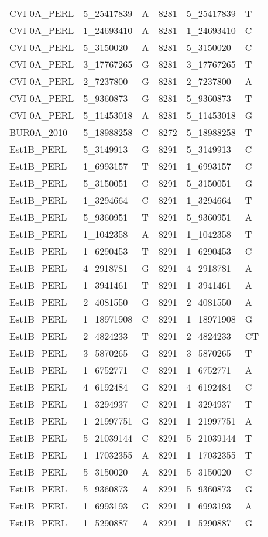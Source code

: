 \begin{center}
\begin{longtable}{|l|l|l|l|l|l|}
CVI-0A\_PERL&5\_25417839&A&8281&5\_25417839&T\\
CVI-0A\_PERL&1\_24693410&A&8281&1\_24693410&C\\
CVI-0A\_PERL&5\_3150020&A&8281&5\_3150020&C\\
CVI-0A\_PERL&3\_17767265&G&8281&3\_17767265&T\\
CVI-0A\_PERL&2\_7237800&G&8281&2\_7237800&A\\
CVI-0A\_PERL&5\_9360873&G&8281&5\_9360873&T\\
CVI-0A\_PERL&5\_11453018&A&8281&5\_11453018&G\\
BUR0A\_2010&5\_18988258&C&8272&5\_18988258&T\\
Est1B\_PERL&5\_3149913&G&8291&5\_3149913&C\\
Est1B\_PERL&1\_6993157&T&8291&1\_6993157&C\\
Est1B\_PERL&5\_3150051&C&8291&5\_3150051&G\\
Est1B\_PERL&1\_3294664&C&8291&1\_3294664&T\\
Est1B\_PERL&5\_9360951&T&8291&5\_9360951&A\\
Est1B\_PERL&1\_1042358&A&8291&1\_1042358&T\\
Est1B\_PERL&1\_6290453&T&8291&1\_6290453&C\\
Est1B\_PERL&4\_2918781&G&8291&4\_2918781&A\\
Est1B\_PERL&1\_3941461&T&8291&1\_3941461&A\\
Est1B\_PERL&2\_4081550&G&8291&2\_4081550&A\\
Est1B\_PERL&1\_18971908&C&8291&1\_18971908&G\\
Est1B\_PERL&2\_4824233&T&8291&2\_4824233&CT\\
Est1B\_PERL&3\_5870265&G&8291&3\_5870265&T\\
Est1B\_PERL&1\_6752771&C&8291&1\_6752771&A\\
Est1B\_PERL&4\_6192484&G&8291&4\_6192484&C\\
Est1B\_PERL&1\_3294937&C&8291&1\_3294937&T\\
Est1B\_PERL&1\_21997751&G&8291&1\_21997751&A\\
Est1B\_PERL&5\_21039144&C&8291&5\_21039144&T\\
Est1B\_PERL&1\_17032355&A&8291&1\_17032355&T\\
Est1B\_PERL&5\_3150020&A&8291&5\_3150020&C\\
Est1B\_PERL&5\_9360873&A&8291&5\_9360873&G\\
Est1B\_PERL&1\_6993193&G&8291&1\_6993193&A\\
Est1B\_PERL&1\_5290887&A&8291&1\_5290887&G\\

\end{longtable}
\end{center}
